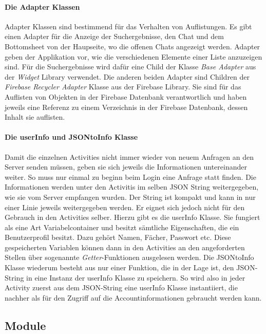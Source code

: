 \documentclass[a4paper,11pt]{report}
\begin{document}
				\paragraph{Die Adapter Klassen}
				Adapter Klassen sind bestimmend für das Verhalten von Auflistungen. Es gibt einen Adapter für die Anzeige der Suchergebnisse, den Chat und dem Bottomsheet von der Haupseite, wo die offenen Chats angezeigt werden. Adapter geben der Applikation vor, wie die verschiedenen Elemente einer Liste anzuzeigen sind. Für die Suchergebnisse wird dafür eine Child der Klasse \emph{Base Adapter} aus der \emph{Widget} Library verwendet. Die anderen beiden Adapter sind Children der \emph{Firebase Recycler Adapter} Klasse aus der Firebase Library. Sie sind für das Auflisten von Objekten in der Firebase Datenbank verantwortlich und haben jeweils eine Referenz zu einem Verzeichnis in der Firebase Datenbank, dessen Inhalt sie auflisten.
				\paragraph{Die userInfo und JSONtoInfo Klasse}
				Damit die einzelnen Activities nicht immer wieder von neuem Anfragen an den Server senden müssen, geben sie sich jeweils die Informationen untereinander weiter. So muss nur einmal zu beginn beim Login eine Anfrage statt finden. Die Informationen werden unter den Activitis im selben JSON String weitergegeben, wie sie vom Server empfangen wurden. Der String ist kompakt und kann in nur einer Linie jeweils weitergegeben werden. Er eignet sich jedoch nicht für den Gebrauch in den Activities selber. Hierzu gibt es die userInfo Klasse. Sie fungiert als eine Art \glqq Variabelcontainer\grqq{} und besitzt sämtliche Eigenschaften, die ein Benutzerprofil besitzt. Dazu gehört Namen, Fächer, Passwort etc. Diese gespeicherten Variablen können dann in den Activities an den angeforderten Stellen über sogenannte \emph{Getter}-Funktionen ausgelesen werden. Die JSONtoInfo Klasse wiederum besteht aus nur einer Funktion, die in der Lage ist, den JSON-String in eine Instanz der userInfo Klasse zu speichern. So wird also in jeder Activity zuerst aus dem JSON-String eine userInfo Klasse instantiiert, die nachher als für den Zugriff auf die Accountinformationen gebraucht werden kann.
			
			\subsection{Module}
\end{document}
